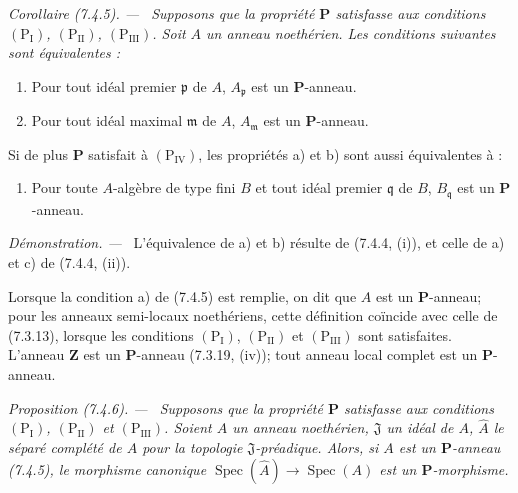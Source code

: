 \documentclass[10pt,oneside]{book}
\newenvironment{proposition}[1][]{%
  \par\medskip\noindent\itshape Proposition (#1). ---\ }{\par}
\newenvironment{corollary}[1][]{%
  \par\medskip\noindent\itshape Corollaire (#1). ---\ }{\par}
\newenvironment{proof}{%
  \par\medskip\noindent\textit{Démonstration. ---\ }}{\par}
\begin{document}
\begin{corollary}[7.4.5]
\label{IV.2.s7.4.5-fr}
Supposons que la propriété $\boldsymbol P$ satisfasse aux conditions
$(\mathrm P_{\mathrm I})$, $(\mathrm P_{\mathrm{II}})$,
$(\mathrm P_{\mathrm{III}})$. Soit $A$ un anneau noethérien. Les conditions
suivantes sont équivalentes :
\begin{enumerate}
\item[\emph{a)}] Pour tout idéal premier $\mathfrak p$ de $A$,
$A_{\mathfrak p}$ est un $\boldsymbol P$-anneau.
\item[\emph{b)}] Pour tout idéal maximal $\mathfrak m$ de $A$,
$A_{\mathfrak m}$ est un $\boldsymbol P$-anneau.
\end{enumerate}
Si de plus $\boldsymbol P$ satisfait à $(\mathrm P_{\mathrm{IV}})$, les
propriétés a) et b) sont aussi équivalentes à :
\begin{enumerate}
\item[\emph{c)}] Pour toute $A$-algèbre de type fini $B$ et tout idéal
premier $\mathfrak q$ de $B$, $B_{\mathfrak q}$ est un
$\boldsymbol P$-anneau.
\end{enumerate}
\end{corollary}

\begin{proof}
L'équivalence de a) et b) résulte de (7.4.4, (i)), et celle de a) et c) de
(7.4.4, (ii)).

Lorsque la condition a) de (7.4.5) est remplie, on dit que $A$ est un
$\boldsymbol P$-anneau; pour les anneaux semi-locaux noethériens, cette
définition coïncide avec celle de (7.3.13), lorsque les conditions
$(\mathrm P_{\mathrm I})$, $(\mathrm P_{\mathrm{II}})$ et
$(\mathrm P_{\mathrm{III}})$ sont satisfaites. L'anneau $\mathbf Z$ est un
$\boldsymbol P$-anneau (7.3.19, (iv)); tout anneau local complet est un
$\boldsymbol P$-anneau.
\end{proof}

\begin{proposition}[7.4.6]
\label{IV.2.s7.4.6-fr}
Supposons que la propriété $\boldsymbol P$ satisfasse aux conditions
$(\mathrm P_{\mathrm I})$, $(\mathrm P_{\mathrm{II}})$ et
$(\mathrm P_{\mathrm{III}})$. Soient $A$ un anneau noethérien,
$\mathfrak J$ un idéal de $A$, $\widehat A$ le séparé complété de $A$ pour
la topologie $\mathfrak J$-préadique. Alors, si $A$ est un
$\boldsymbol P$-anneau (7.4.5), le morphisme canonique
$\operatorname{Spec}(\widehat A)\to\operatorname{Spec}(A)$ est un
$\boldsymbol P$-morphisme.
\end{proposition}
\end{document}
